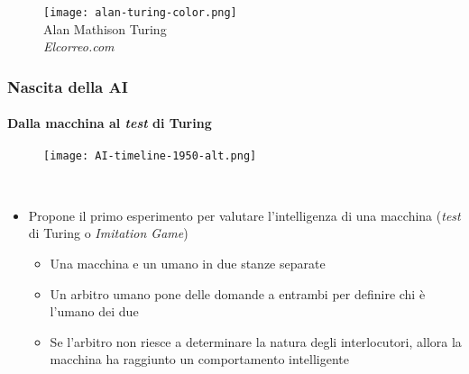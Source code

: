 \begin{frame}[t,fragile]
{\begin{minipage}[t]{\textwidth}
\begin{minipage}[t]{0.6\textwidth}
            	\end{minipage}
            	\begin{minipage}[t]{0.4\textwidth}
                	\centering
                	\begin{figure}[ht]
						\texttt{[image: alan-turing-color.png]}
						{\tiny\\Alan Mathison Turing\\\vspace*{-1pt}\textit{\textcopyright Elcorreo.com}}
                	\end{figure}
            	\end{minipage}
	    	\end{minipage}
	}
\end{frame}
%
\begin{frame}[t,fragile] \frametitle{Nascita della AI}
    {\scriptsize
        \framesubtitle{Dalla macchina al \textit{test} di Turing}
        \vspace*{-15pt}
	    \begin{minipage}[t]{\textwidth}
		    \begin{figure}[ht]
			    \centering
			    \texttt{[image: AI-timeline-1950-alt.png]}
		    \end{figure}
	    \end{minipage}
	    \\\vspace*{3pt}
	    \begin{minipage}[t]{\textwidth}
		    \begin{minipage}[t]{0.6\textwidth}
			    \begin{itemize}[leftmargin=10pt,align=right]
				    \onslide<2->\item[\alert{\faArrowCircleRight}] Propone il primo esperimento per valutare l'intelligenza di una macchina (\alert{\textit{test} di Turing} o \alert{\textit{Imitation Game}})
				    \onslide<3->\begin{itemize}[leftmargin=10pt,align=right]
						\item[\alert{\faArrowCircleRight}] Una macchina e un umano in due stanze separate
						\item[\alert{\faArrowCircleRight}] Un arbitro umano pone delle domande a entrambi per definire chi è l'umano dei due
						\item[\alert{\faArrowCircleRight}] Se l'arbitro non riesce a determinare la natura degli interlocutori, allora la macchina ha raggiunto un comportamento intelligente

\end{itemize}
\end{itemize}
\end{minipage}
\end{minipage}}
\end{frame}
